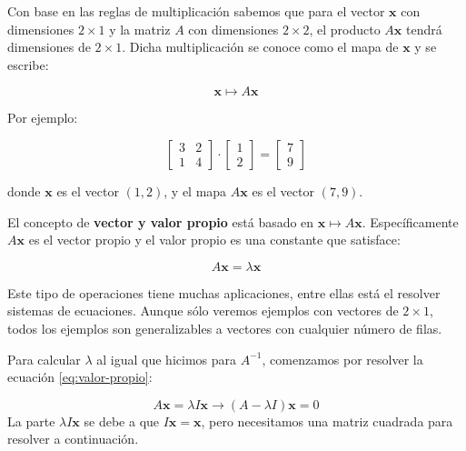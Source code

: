 \documentclass[
]{book}
\begin{document}
Con base en las reglas de multiplicación sabemos que para el vector \(\mathbf{x}\) con dimensiones \(2 \times 1\) y la matriz \(A\) con dimensiones \(2 \times 2\), el producto \(A \mathbf{x}\) tendrá dimensiones de \(2 \times 1\). Dicha multiplicación se conoce como el mapa de \(\mathbf{x}\) y se escribe:

\begin{equation}
\mathbf{x} \mapsto A\mathbf{x} \label{eq:mapa}
\end{equation}

Por ejemplo:

\begin{equation}
    \left[
    \begin{array}{cc}
    3 & 2 \\
    1 & 4
    \end{array}
    \right] \cdot 
        \left[ 
    \begin{array}{c}
    1 \\ 2
    \end{array}
    \right]= 
    \left[
    \begin{array}{c}
    7 \\ 9
    \end{array}
    \right]
\end{equation}

donde \(\mathbf{x}\) es el vector \((1, 2)\), y el mapa \(A \mathbf{x}\) es el vector \((7, 9)\).

El concepto de \textbf{vector y valor propio} está basado en \(\mathbf{x} \mapsto A \mathbf{x}\). Específicamente \(A \mathbf{x}\) es el vector propio y el valor propio es una constante que satisface:

\begin{equation}
A \mathbf{x} = \lambda \mathbf{x} \label{eq:valor-propio}
\end{equation}

Este tipo de operaciones tiene muchas aplicaciones, entre ellas está el resolver sistemas de ecuaciones. Aunque sólo veremos ejemplos con vectores de \(2 \times 1\), todos los ejemplos son generalizables a vectores con cualquier número de filas.

Para calcular \(\lambda\) al igual que hicimos para \(A^{-1}\), comenzamos por resolver la ecuación \eqref{eq:valor-propio}:

\[A \mathbf{x} = \lambda I \mathbf{x} \rightarrow (A - \lambda I) \mathbf{x} = 0\]
La parte \(\lambda I \mathbf{x}\) se debe a que \(I \mathbf{x} = \mathbf{x}\), pero necesitamos una matriz cuadrada para resolver a continuación.
\end{document}
